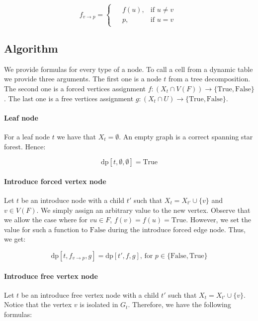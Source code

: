 \documentclass[en]{pracamgr}
\theoremstyle{definition}
\newcommand{\dpt}[1]{\textrm{dp}[#1]}
\newcommand{\true}{\textrm{True}}
\newcommand{\false}{\textrm{False}}
\begin{document}
\begin{equation*}
	f_{v \rightarrow p} =
	\begin{cases}
	\begin{aligned}
		&f(u), & \text{if $u \neq v$} \\
		&p, &\text{if $u = v$}
	\end{aligned}
	\end{cases}
\end{equation*}

\subsection{Algorithm}

We provide formulas for every type of a node. To call a cell from a dynamic table we provide three arguments. The first one is a node $t$ from a tree decomposition. The second one is a forced vertices assignment $f:(X_t \cap V(F)) \rightarrow \{\true, \false\}$. The last one is  a free vertices assignment $g:(X_t \cap U) \rightarrow \{\true, \false\}$.

\paragraph{Leaf node} For a leaf node $t$ we have that $X_t=\emptyset$. An empty graph is a correct spanning star forest. Hence:

\begin{equation*}
	\dpt{t,\emptyset,\emptyset}=\true
\end{equation*}

\paragraph{Introduce forced vertex node} Let $t$ be an introduce node with a child $t'$ such that $X_t = X_{t'} \cup \{v\}$ and $v \in V(F)$. We simply assign an arbitrary value to the new vertex. Observe that we allow the case where for $vu \in F$, $f(v)=f(u)=\true$. However, we set the value for such a function to $\false$ during the introduce forced edge node. Thus, we get:

\begin{equation*}
	\dpt{t,f_{v \rightarrow p},g}= \dpt{t',f,g}\text{, for $p \in \{\false,\true\}$}
\end{equation*}

\paragraph{Introduce free vertex node} Let $t$ be an introduce free vertex node with a child $t'$ such that $X_t = X_{t'} \cup \{v\}$. Notice that the vertex $v$ is isolated in $G_t$. Therefore, we have the following formulas:
\end{document}
